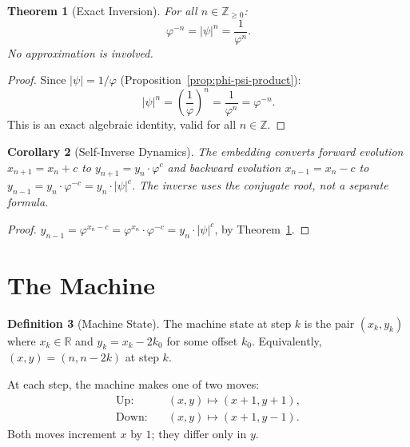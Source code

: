 \documentclass[11pt,a4paper]{article}
\theoremstyle{plain}
\newtheorem{theorem}{Theorem}[section]
\newtheorem{corollary}[theorem]{Corollary}
\theoremstyle{definition}
\newtheorem{definition}[theorem]{Definition}
\newcommand{\R}{\mathbb{R}}
\newcommand{\Z}{\mathbb{Z}}
\newcommand{\vp}{\varphi}
\newcommand{\ps}{\psi}
\begin{document}
\begin{theorem}[Exact Inversion]\label{thm:inversion}
For all $n \in \Z_{\ge 0}$:
\begin{equation}\label{eq:inversion}
  \vp^{-n} = |\ps|^{n} = \frac{1}{\vp^{n}}.
\end{equation}
No approximation is involved.
\end{theorem}

\begin{proof}
Since $|\ps| = 1/\vp$ (Proposition~\ref{prop:phi-psi-product}):
\[
  |\ps|^{n} = \left(\frac{1}{\vp}\right)^{n} = \frac{1}{\vp^{n}} = \vp^{-n}.
\]
This is an exact algebraic identity, valid for all $n \in \Z$.
\end{proof}

\begin{corollary}[Self-Inverse Dynamics]\label{cor:self-inverse}
The embedding converts forward evolution $x_{n+1} = x_{n} + c$ to
$y_{n+1} = y_{n} \cdot \vp^{c}$ and backward evolution
$x_{n-1} = x_{n} - c$ to $y_{n-1} = y_{n} \cdot \vp^{-c}
= y_{n} \cdot |\ps|^{c}$.  The inverse uses the conjugate root,
not a separate formula.
\end{corollary}

\begin{proof}
$y_{n-1} = \vp^{x_{n} - c} = \vp^{x_{n}} \cdot \vp^{-c}
= y_{n} \cdot |\ps|^{c}$, by Theorem~\ref{thm:inversion}.
\end{proof}

\section{The Machine}\label{sec:machine}

\begin{definition}[Machine State]\label{def:machine}
The machine state at step $k$ is the pair $(x_{k}, y_{k})$ where
$x_{k} \in \R$ and $y_{k} = x_{k} - 2k_{0}$ for some offset $k_{0}$.
Equivalently, $(x, y) = (n, n - 2k)$ at step $k$.

At each step, the machine makes one of two moves:
\begin{align}
  \text{Up:} &\quad (x, y) \mapsto (x+1, y+1), \label{eq:up}\\
  \text{Down:} &\quad (x, y) \mapsto (x+1, y-1). \label{eq:down}
\end{align}
Both moves increment $x$ by $1$; they differ only in $y$.
\end{definition}
\end{document}
